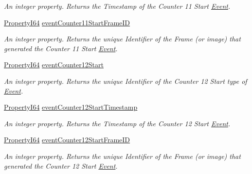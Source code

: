 \begin{DoxyCompactItemize}
\begin{DoxyCompactList}\small\item\em An integer property. Returns the Timestamp of the Counter 11 Start \hyperlink{classmv_i_m_p_a_c_t_1_1acquire_1_1_event}{Event}. \end{DoxyCompactList}\item 
\hyperlink{group___common_interface_ga81749b2696755513663492664a18a893}{Property\+I64} \hyperlink{classmv_i_m_p_a_c_t_1_1acquire_1_1_gen_i_cam_1_1_event_control_ac50eb18b1a1c111bc65b499df5f9f241}{event\+Counter11\+Start\+Frame\+I\+D}
\begin{DoxyCompactList}\small\item\em An integer property. Returns the unique Identifier of the Frame (or image) that generated the Counter 11 Start \hyperlink{classmv_i_m_p_a_c_t_1_1acquire_1_1_event}{Event}. \end{DoxyCompactList}\item 
\hyperlink{group___common_interface_ga81749b2696755513663492664a18a893}{Property\+I64} \hyperlink{classmv_i_m_p_a_c_t_1_1acquire_1_1_gen_i_cam_1_1_event_control_a2e989c806a97bbc2f5eda2dc434eecda}{event\+Counter12\+Start}
\begin{DoxyCompactList}\small\item\em An integer property. Returns the unique Identifier of the Counter 12 Start type of \hyperlink{classmv_i_m_p_a_c_t_1_1acquire_1_1_event}{Event}. \end{DoxyCompactList}\item 
\hyperlink{group___common_interface_ga81749b2696755513663492664a18a893}{Property\+I64} \hyperlink{classmv_i_m_p_a_c_t_1_1acquire_1_1_gen_i_cam_1_1_event_control_a2853dbaf1b04cce3c42101bddce4fa06}{event\+Counter12\+Start\+Timestamp}
\begin{DoxyCompactList}\small\item\em An integer property. Returns the Timestamp of the Counter 12 Start \hyperlink{classmv_i_m_p_a_c_t_1_1acquire_1_1_event}{Event}. \end{DoxyCompactList}\item 
\hyperlink{group___common_interface_ga81749b2696755513663492664a18a893}{Property\+I64} \hyperlink{classmv_i_m_p_a_c_t_1_1acquire_1_1_gen_i_cam_1_1_event_control_abb0642df8115d4253262588cce2862c6}{event\+Counter12\+Start\+Frame\+I\+D}
\begin{DoxyCompactList}\small\item\em An integer property. Returns the unique Identifier of the Frame (or image) that generated the Counter 12 Start \hyperlink{classmv_i_m_p_a_c_t_1_1acquire_1_1_event}{Event}. \end{DoxyCompactList}\item 

\end{DoxyCompactItemize}
